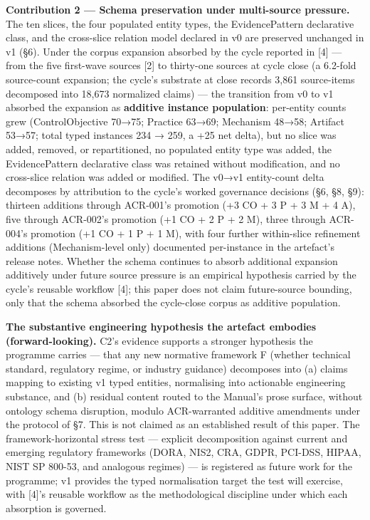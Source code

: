 \documentclass[
]{article}
\begin{document}
\textbf{Contribution 2 --- Schema preservation under multi-source
pressure.} The ten slices, the four populated entity types, the
EvidencePattern declarative class, and the cross-slice relation model
declared in v0 are preserved unchanged in v1 (§6). Under the corpus
expansion absorbed by the cycle reported in {[}4{]} --- from the five
first-wave sources {[}2{]} to thirty-one sources at cycle close (a
6.2-fold source-count expansion; the cycle's substrate at close records
3,861 source-items decomposed into 18,673 normalized claims) --- the
transition from v0 to v1 absorbed the expansion as \textbf{additive
instance population}: per-entity counts grew (ControlObjective 70→75;
Practice 63→69; Mechanism 48→58; Artifact 53→57; total typed instances
234 → 259, a +25 net delta), but no slice was added, removed, or
repartitioned, no populated entity type was added, the EvidencePattern
declarative class was retained without modification, and no cross-slice
relation was added or modified. The v0→v1 entity-count delta decomposes
by attribution to the cycle's worked governance decisions (§6, §8, §9):
thirteen additions through ACR-001's promotion (+3 CO + 3 P + 3 M + 4
A), five through ACR-002's promotion (+1 CO + 2 P + 2 M), three through
ACR-004's promotion (+1 CO + 1 P + 1 M), with four further within-slice
refinement additions (Mechanism-level only) documented per-instance in
the artefact's release notes. Whether the schema continues to absorb
additional expansion additively under future source pressure is an
empirical hypothesis carried by the cycle's reusable workflow {[}4{]};
this paper does not claim future-source bounding, only that the schema
absorbed the cycle-close corpus as additive population.

\textbf{The substantive engineering hypothesis the artefact embodies
(forward-looking).} C2's evidence supports a stronger hypothesis the
programme carries --- that any new normative framework F (whether
technical standard, regulatory regime, or industry guidance) decomposes
into (a) claims mapping to existing v1 typed entities, normalising into
actionable engineering substance, and (b) residual content routed to the
Manual's prose surface, without ontology schema disruption, modulo
ACR-warranted additive amendments under the protocol of §7. This is not
claimed as an established result of this paper. The framework-horizontal
stress test --- explicit decomposition against current and emerging
regulatory frameworks (DORA, NIS2, CRA, GDPR, PCI-DSS, HIPAA, NIST SP
800-53, and analogous regimes) --- is registered as future work for the
programme; v1 provides the typed normalisation target the test will
exercise, with {[}4{]}'s reusable workflow as the methodological
discipline under which each absorption is governed.
\end{document}
